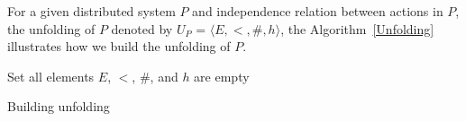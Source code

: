 \documentclass[a4paper,11pt]{article}
\theoremstyle{break}
\begin{document}
  For a given distributed system $P$ and independence relation between actions in $P$, the unfolding of $P$ denoted by $U_P$ = $\langle E,<,\#,h \rangle$, the Algorithm~\ref{Unfolding} illustrates how we build the unfolding of $P$.
  
\begin{algorithm}[H]
	Set all elements $E$, $<$, $\#$, and $h$ are empty\\
	
	
	
	\caption{Building unfolding\cite{DBLP:journals/corr/abs-1802-03950}}
	\label{Unfolding}
\end{algorithm}
\end{document}
